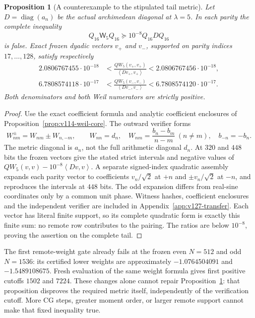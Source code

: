 \documentclass[11pt]{article}
\newtheorem{proposition}[theorem]{Proposition}
\theoremstyle{remark}
\newcommand{\ip}[2]{\left\langle #1,#2\right\rangle}
\begin{document}
\begin{proposition}[A counterexample to the stipulated tail metric]
\label{prop:v127-metric-fails}
Let $D=\operatorname{diag}(a_n)$ be the actual archimedean diagonal
at $\lambda=5$. In each parity the complete inequality
\[
 Q_{16}\mathsf W_5Q_{16}\succeq10^{-8}Q_{16}DQ_{16}
\]
is false. Exact frozen dyadic vectors $v_+$ and $v_-$, supported on
parity indices $17,\ldots,128$, satisfy respectively
\begin{align*}
 2.0806767455\cdot10^{-18}
 &<\frac{QW_5(v_+,v_+)}{\ip{Dv_+}{v_+}}
 <2.0806767456\cdot10^{-18},\\
 6.7808574118\cdot10^{-17}
 &<\frac{QW_5(v_-,v_-)}{\ip{Dv_-}{v_-}}
 <6.7808574120\cdot10^{-17}.
\end{align*}
Both denominators and both Weil numerators are strictly positive.
\end{proposition}
\begin{proof}
Use the exact coefficient formula and analytic coefficient enclosures
of Proposition~\ref{prop:v114-weil-core}. The outward verifier forms
\[
 W_{nm}^{\pm}=W_{nm}\pm W_{n,-m},\qquad
 W_{nn}=d_n,\quad
 W_{nm}=\frac{b_n-b_m}{n-m}\ (n\ne m),\quad b_{-n}=-b_n.
\]
The metric diagonal is $a_n$, not the full arithmetic diagonal $d_n$.
At $320$ and $448$ bits the frozen vectors give the stated strict
intervals and negative values of $QW_5(v,v)-10^{-8}\ip{Dv}{v}$.
A separate signed-index quadratic assembly expands each parity vector
to coefficients $v_n/\sqrt2$ at $+n$ and $\pm v_n/\sqrt2$ at $-n$,
and reproduces the intervals at $448$ bits. The odd expansion differs
from real-sine coordinates only by a common unit phase. Witness hashes,
coefficient enclosures and the independent verifier are included in
Appendix~\ref{app:v127-transfer}. Each vector has literal finite support,
so its complete quadratic form is exactly this finite sum: no remote
row contributes to the pairing. The ratios are below $10^{-8}$,
proving the assertion on the complete tail.
\end{proof}

The first remote-weight gate already fails at the frozen even
$N=512$ and odd $N=1536$: its certified lower weights are approximately
$-1.0764504091$ and $-1.5489108675$. Fresh evaluation of the same
weight formula gives first positive cutoffs $1502$ and $7224$.
These changes alone cannot repair Proposition~\ref{prop:v127-metric-fails}:
that proposition disproves the required metric itself, independently
of the verification cutoff. More CG steps, greater moment order, or
larger remote support cannot make that fixed inequality true.
\end{document}
